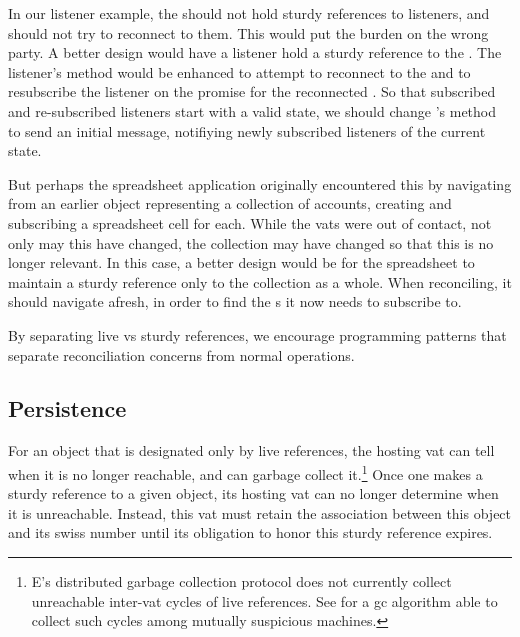 \documentclass{llncs}
\begin{document}
In our listener example, the  should not hold
sturdy references to listeners, and should not try to reconnect to
them. This would put the burden on the wrong party. A better design
would have a listener hold a sturdy reference to the
. The listener's 
method would be enhanced to attempt to reconnect to the
 and to resubscribe the listener on the promise for
the reconnected . 
%
So that subscribed and re-subscribed listeners start with a valid
state, we should change 's 
method to send an initial  message, notifiying
newly subscribed listeners of the current state.

But perhaps the spreadsheet application originally encountered this
 by navigating from an earlier object representing
a collection of accounts, creating and subscribing a spreadsheet cell
for each. While the vats were out of contact, not only may this
 have changed, the collection may have changed so
that this  is no longer relevant. In this case, a
better design would be for the spreadsheet to maintain a sturdy
reference only to the collection as a whole. When reconciling, it
should navigate afresh, in order to find the s it
now needs to subscribe to.

By separating live vs sturdy references, we encourage programming
patterns that separate reconciliation concerns from normal operations.

\subsection{Persistence}

For an object that is designated only by live references, the hosting
vat can tell when it is no longer reachable, and can garbage collect
it.\footnote{
%
E's distributed garbage collection protocol does not currently collect
unreachable inter-vat cycles of live references. See \cite{bejar:gc}
for a gc algorithm able to collect such cycles among mutually
suspicious machines.}
%
Once one makes a sturdy reference to a given object, its hosting vat
can no longer determine when it is unreachable. Instead, this vat must
retain the association between this object and its swiss number until
its obligation to honor this sturdy reference expires.
\end{document}
